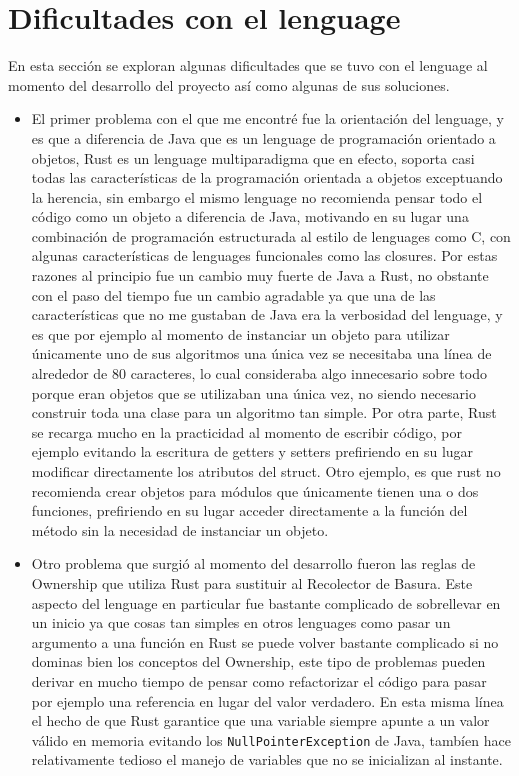 \documentclass[12pt]{article}
\begin{document}
\section{Dificultades con el lenguage}

En esta sección se exploran algunas dificultades que se tuvo con el lenguage al momento del desarrollo del proyecto así como algunas de sus soluciones.

\begin{itemize}

\item El primer problema con el que me encontré fue la orientación del lenguage, y es que a diferencia de Java que es un lenguage de programación orientado a objetos, Rust es un lenguage multiparadigma que en efecto, soporta casi todas las características de la programación orientada a objetos exceptuando la herencia, sin embargo el mismo lenguage no recomienda pensar todo el código como un objeto a diferencia de Java, motivando en su lugar una combinación de programación estructurada al estilo de lenguages como C, con algunas características de lenguages funcionales como las closures. Por estas razones al principio fue un cambio muy fuerte de Java a Rust, no obstante con el paso del tiempo fue un cambio agradable ya que una de las características que no me gustaban de Java era la verbosidad del lenguage, y es que por ejemplo al momento de instanciar un objeto para utilizar únicamente uno de sus algoritmos una única vez se necesitaba una línea de alrededor de 80 caracteres, lo cual consideraba algo innecesario sobre todo porque eran objetos que se utilizaban una única vez, no siendo necesario construir toda una clase para un algoritmo tan simple. Por otra parte, Rust se recarga mucho en la practicidad al momento de escribir código, por ejemplo evitando la escritura de getters y setters prefiriendo en su lugar modificar directamente los atributos del struct. Otro ejemplo, es que rust no recomienda crear objetos para módulos que únicamente tienen una o dos funciones, prefiriendo en su lugar acceder directamente a la función del método sin la necesidad de instanciar un objeto.

\item Otro problema que surgió al momento del desarrollo fueron las reglas de Ownership que utiliza Rust para sustituir al Recolector de Basura. Este aspecto del lenguage en particular fue bastante complicado de sobrellevar en un inicio ya que cosas tan simples en otros lenguages como pasar un argumento a una función en Rust se puede volver bastante complicado si no dominas bien los conceptos del Ownership, este tipo de problemas pueden derivar en mucho tiempo de pensar como refactorizar el código para pasar por ejemplo una referencia en lugar del valor verdadero. En esta misma línea el hecho de que Rust garantice que una variable siempre apunte a un valor válido en memoria evitando los \texttt{NullPointerException} de Java, tambíen hace relativamente tedioso el manejo de variables que no se inicializan al instante.


\end{itemize}
\end{document}
